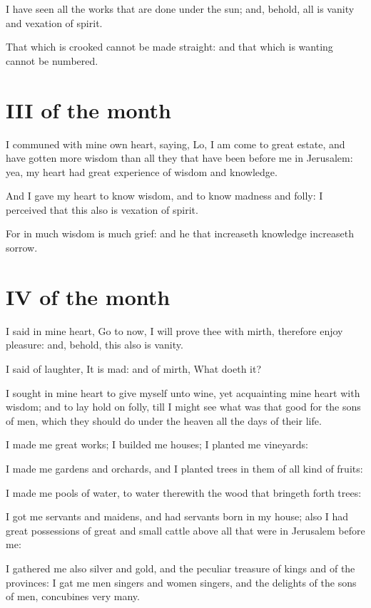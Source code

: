 I have seen all the works that are done under the sun; and, behold, all is vanity and vexation of spirit.

That which is crooked cannot be made straight: and that which is wanting cannot be numbered.

\section*{III of the month}

I communed with mine own heart, saying, Lo, I am come to great estate, and have gotten more wisdom than all they that have been before me in Jerusalem: yea, my heart had great experience of wisdom and knowledge.

And I gave my heart to know wisdom, and to know madness and folly: I perceived that this also is vexation of spirit.

For in much wisdom is much grief: and he that increaseth knowledge increaseth sorrow.

\section*{IV of the month}

I said in mine heart, Go to now, I will prove thee with mirth, therefore enjoy pleasure: and, behold, this also is vanity.

I said of laughter, It is mad: and of mirth, What doeth it?

I sought in mine heart to give myself unto wine, yet acquainting mine heart with wisdom; and to lay hold on folly, till I might see what was that good for the sons of men, which they should do under the heaven all the days of their life.

I made me great works; I builded me houses; I planted me vineyards:

I made me gardens and orchards, and I planted trees in them of all kind of fruits:

I made me pools of water, to water therewith the wood that bringeth forth trees:

I got me servants and maidens, and had servants born in my house; also I had great possessions of great and small cattle above all that were in Jerusalem before me:

 I gathered me also silver and gold, and the peculiar treasure of kings and of the provinces: I gat me men singers and women singers, and the delights of the sons of men, concubines very many.

